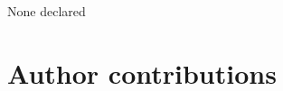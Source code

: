 None declared
\section*{Author contributions}
\label{sec:author1}

\cleardoublepage

\begin{otherlanguage}{english}

\end{otherlanguage}
